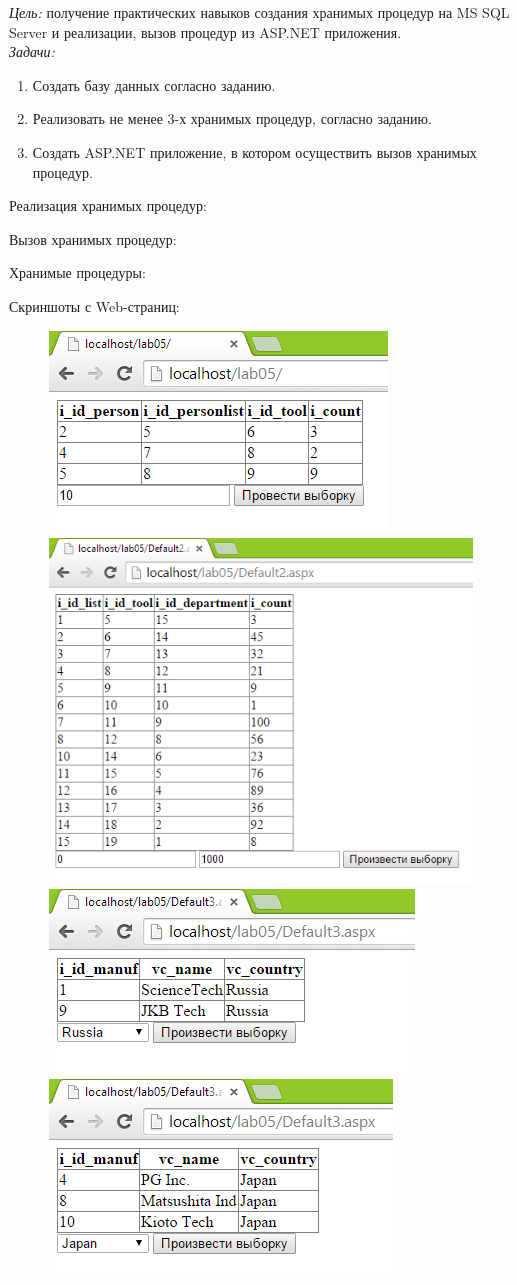 \documentclass[pscyr]{hedlab}
\begin{document}
    \makeheader
    \emph{Цель:} получение практических навыков создания хранимых процедур на MS SQL Server и 
    реализации, вызов процедур из ASP.NET приложения.\\
    \emph{Задачи:} 
    \begin{enumerate}
        \item Создать базу данных согласно заданию.
        \item Реализовать не менее 3-х хранимых процедур, согласно заданию.
        \item Создать ASP.NET приложение, в котором осуществить вызов хранимых процедур.
    \end{enumerate}
    Реализация хранимых процедур:
    
    Вызов хранимых процедур:
    
    Хранимые процедуры:
    
    
    \pagebreak

    Скриншоты с Web-страниц:
    \begin{figure}[h!]
        \center
        \includegraphics[width=.47\textwidth]{lab05_01} \hspace{1em}
        \includegraphics[width=.47\textwidth]{lab05_02} \\
        \includegraphics[width=.47\textwidth]{lab05_03} \hspace{1em}
        \includegraphics[width=.47\textwidth]{lab05_04}
    \end{figure}
\end{document}
